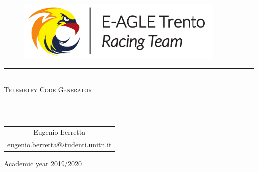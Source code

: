 \pagestyle{plain}

\thispagestyle{empty}

\begin{center}
  \begin{figure}[h!]
    \centerline{\includegraphics[width=0.9\textwidth]{images/Logo_Anteriore.pdf}}
  \end{figure}
    
    \vspace{0.7 cm} 
    
    \rule{\linewidth}{0.2 mm} \\[1 cm]
  
  \Huge\textsc{Telemetry Code Generator}
  
  \vspace{0.7 cm} 
  \rule{\linewidth}{0.2 mm} \\[1 cm]
  \vspace{2 cm}
    \begin{center}
        \begin{tabular}{c}
            Eugenio Berretta\\
            eugenio.berretta@studenti.unitn.it
        \end{tabular}
    \end{center}

  \vspace{4 cm} 

  \Large{Academic year 2019/2020}
  \\[1cm]
  
\end{center}

